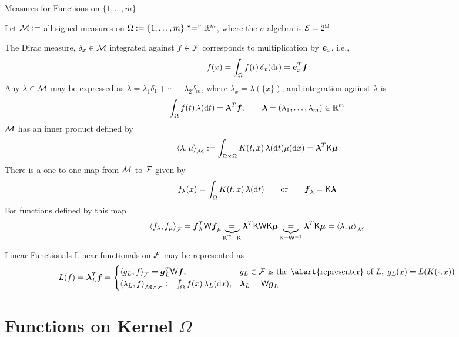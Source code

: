 \documentclass[10pt,compress,xcolor={usenames,dvipsnames},aspectratio=169]{beamer}
\begin{document}
\begin{frame}[allowframebreaks]{Measures for Functions on $\{1, \ldots, m\}$}
	
	\vspace{-3ex}
	Let $\cm:=$ all signed measures on $\Omega := \{1, \ldots, m\} \text{ ``$=$'' } \reals^m$, where the $\sigma$-algebra is $\ce = 2^\Omega$

 The Dirac measure, $\delta_x\in \cm$ integrated against $f \in \cf$ corresponds to multiplication by $\ve_x$, i.e., 
 \[
f(x) = \int_\Omega f(t) \, \delta_x(\dif t) = \ve_x^T \vf
 \]
 Any $\lambda \in \cm$ may be expressed as $\lambda = \lambda_1 \delta_1 + \cdots + \lambda_2 \delta_m $, where $\lambda_x = \lambda(\{x\})$, and integration against $\lambda$ is
\[
\int_\Omega f(t) \, \lambda(\dif t) = \vlambda^T \vf, \qquad \vlambda = (\lambda_1, \ldots, \lambda_m) \in \reals^m
\]
$\cm$ has an inner product defined by
\[
\ip[\cm]{\lambda}{\mu} := \int_{\Omega \times \Omega}K(t,x) \, \lambda(\dif t) \mu( \dif x) = \vlambda^T\mK\vmu
\]
There is a one-to-one map from $\cm$ to $\cf$ given by 
\[
f_\lambda(x) = \int_\Omega K(t,x) \, \lambda(\dif t)  \qquad \text{or} \qquad \vf_\lambda = \mK \vlambda
\]
For functions defined by this map
\[
\ip[\cf]{f_\lambda}{f_\mu} = \vf_\lambda^T \mW \vf_\mu \underbrace{=}_{\mK^T = \mK} \vlambda^T \mK \mW \mK \vmu \underbrace{=}_{\mK = \mW^{-1}} \vlambda^T \mK \vmu = \ip[\cm]{\lambda}{\mu}
\]

\end{frame}


\begin{frame}{Linear Functionals}
	Linear functionals on $\cf$ may be represented as
	\[
	L(f) =  \vlambda_L^T \vf  = 
	\begin{cases} \ip[\cf]{g_L}{f} = \vg_L^T \mW \vf, & g_L\in \cf   \text{ is the \alert{representer} of } L, \;  
		g_L(x) = L(K(\cdot,x)) \\
		\ip[\cm \times \cf]{\lambda_L}{f} : = \int_\Omega f(x) \, \lambda_L(\dif x), & \vlambda_L = \mW \vg_L
	\end{cases}
\]
\end{frame}




\section{Functions on Kernel $\Omega$}
\end{document}
